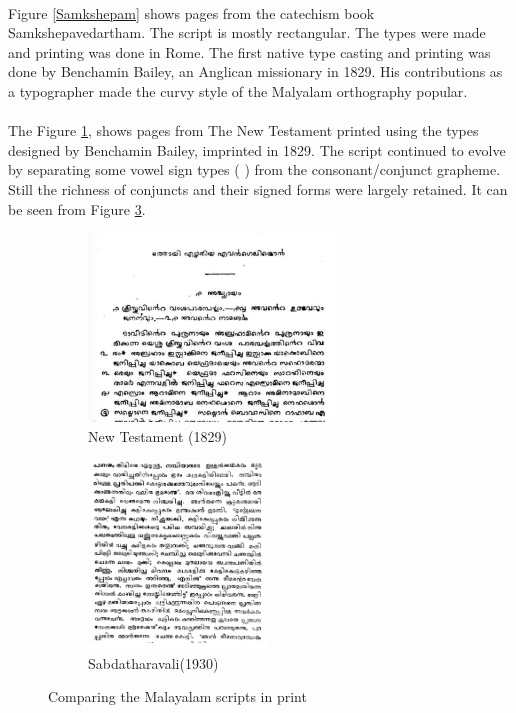 \documentclass[10pt]{article}
\begin{document}
\paragraph{}
Figure \ref{Samkshepam} shows pages from the catechism book Samkshepavedartham. The script is mostly rectangular. The types were made and printing was done in Rome. The first native type casting and printing was done by Benchamin Bailey, an Anglican missionary in 1829.  His contributions as a typographer made the curvy style of the Malyalam orthography popular\cite{gupthannair}.


\paragraph{}
The Figure \ref{newtestament}, shows pages from The New Testament printed using the types designed by Benchamin Bailey, imprinted in 1829\cite{babucherian}. The script continued to evolve by separating some vowel sign types ({ }) from the consonant/conjunct grapheme. Still the richness of conjuncts and their signed forms were largely retained. It can be seen from Figure \ref{Sabdatharavali}. 


\begin{figure}[h]
\begin{subfigure}{.5\textwidth}
 \centering
 \includegraphics[width=\linewidth, height=5cm]{images/newtestament1829.png}
 \caption{New Testament (1829)}
 \label{newtestament}
\end{subfigure}%
\begin{subfigure}{.5\textwidth}
 \centering
 \includegraphics[width=\linewidth,height=5cm]{images/1930-Sabdatharavali.png}
 \caption{Sabdatharavali(1930)}
 \label{Sabdatharavali}
\end{subfigure}
\caption{Comparing the Malayalam scripts in print}
\end{figure}
\end{document}
